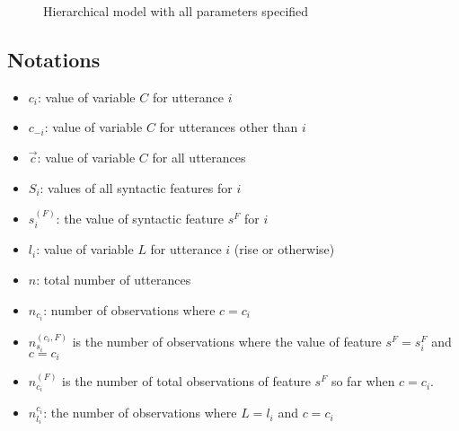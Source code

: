 
\begin{figure}[H]
\begin{center}
\end{center}
\caption{Hierarchical model with all parameters specified}\label{fg:model}
\end{figure}

\subsection{Notations}
\begin{itemize}
\item $c_{i}$: value of variable $C$ for utterance $i$
\item $c_{-i}$: value of variable $C$ for utterances other than $i$
\item $\vec{c}$: value of variable $C$ for all utterances
\item $S_{i}$: values of all syntactic features for $i$
\item $s^{(F)}_{i}$: the value of syntactic feature $s^{F}$ for $i$
\item $l_{i}$: value of variable $L$ for utterance $i$ (rise or otherwise)
\item $n$: total number of utterances
\item $n_{c_{i}}$: number of observations where $c=c_{i}$
\item $n^{(c_{i}, F)}_{s_{i}}$ is the number of observations where the value of feature $s^{F} = s^{F}_{i}$ and $c = c_{i}$ 
\item $n^{(F)}_{c_{i}}$ is the number of total observations of feature $s^{F}$ so far when $c = c_{i}$. 
\item $n^{c_{i}}_{l_{i}}$: the number of observations where $L = l_{i}$ and $c = c_{i}$
\end{itemize}

